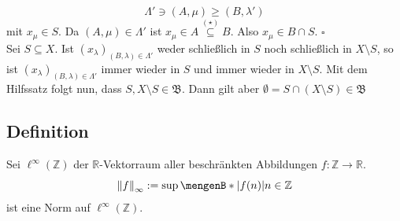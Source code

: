 \[
	\Lambda' \ni (A, \mu) \ge (B,\lambda ') \tag*{($\star$)}
\]
mit $x_{\mu} \in S$. Da $(A,\mu) \in \Lambda'$ ist $x_\mu \in A \stackrel{(\star)}{\subseteq} B$. Also $x_\mu \in B \cap S$. $\square$ \smallskip \\
Sei $S \subseteq X$. Ist $(x_\lambda )_{(B,\lambda)  \in \Lambda'}$ weder schließlich in $S$ noch schließlich in $X \setminus S$, so ist 
$(x_\lambda )_{(B,\lambda)  \in \Lambda'}$ immer wieder in $S$ und immer wieder in $X \setminus S$.
Mit dem Hilfssatz folgt nun, dass $S, X \setminus S \in \mathfrak{B}$. Dann gilt aber $\emptyset = S \cap (X \setminus S) \in \mathfrak{B}$ \light \bewende

\subsection[Definition: Vektorraum der beschränkten Abbildungen]{Definition} %
\label{sub:413}
Sei $\ell^\infty(\mathds{Z}) $ der $\mathds{R}$-Vektorraum aller beschränkten Abbildungen $f : \mathds{Z} \to \mathds{R}$.
\[
	\norm[\infty]{f} := \sup \set[\abs*{f(n)} ]{n \in \mathds{Z}}  
\]
ist eine Norm auf $\ell^\infty(\mathds{Z})$.

